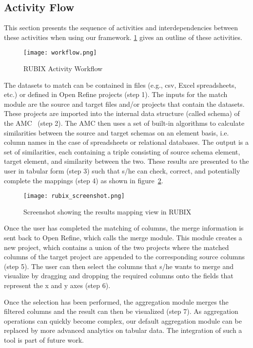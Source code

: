 \subsection{Activity Flow}
This section presents the sequence of activities and interdependencies between these activities when using our framework. \ref{fig:Activity_workflow} gives an outline of these activities.

\begin{figure}[ht!]
  \centering
    \texttt{[image: workflow.png]}
  \caption{RUBIX Activity Workflow}
  \label{fig:Activity_workflow}
\end{figure}

The datasets to match can be contained in files (e.g., csv, Excel spreadsheets, etc.) or defined in Open Refine projects (step 1). The inputs for the match module are the source and target files and/or projects that contain the datasets. These projects are imported into the internal data structure (called schema) of the AMC~\cite{Peukert:ICDE:11} (step 2). The AMC then uses a set of built-in algorithms to calculate similarities between the source and target schemas on an element basis, i.e. column names in the case of spreadsheets or relational databases. The output is a set of similarities, each containing a triple consisting of source schema element, target element, and similarity between the two. These results are presented to the user in tabular form (step 3) such that s/he can check, correct, and potentially complete the mappings (step 4) as shown in figure~\ref{fig:rubix_screenshot}.

\begin{figure}[ht!]
  \centering
    \texttt{[image: rubix\_screenshot.png]}
  \caption{Screenshot showing the results mapping view in RUBIX}
  \label{fig:rubix_screenshot}
\end{figure}

Once the user has completed the matching of columns, the merge information is sent back to Open Refine, which calls the merge module. This module creates a new project, which contains a union of the two projects where the matched columns of the target project are appended to the corresponding source columns (step 5). The user can then select the columns that s/he wants to merge and visualize by dragging and dropping the required columns onto the fields that represent the x and y axes (step 6).

Once the selection has been performed, the aggregation module merges the filtered columns and the result can then be visualized (step 7). As aggregation operations can quickly become complex, our default aggregation module can be replaced by more advanced analytics on tabular data. The integration of such a tool is part of future work.

